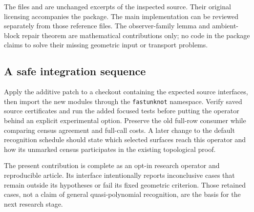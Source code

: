 The  files and
 are unchanged excerpts of
the inspected source.  Their original licensing accompanies the package.
The main implementation can be reviewed separately from those reference
files.  The observer-family lemma and ambient-block repair theorem are
mathematical contributions only; no code in the package claims to solve
their missing geometric input or transport problems.

\subsection{A safe integration sequence}

Apply the additive patch to a checkout containing the expected source
interfaces, then import the new modules through the \texttt{fastunknot}
namespace.  Verify saved source certificates and run the added focused
tests before putting the operator behind an explicit experimental option.
Preserve the old full-row consumer while comparing census agreement and
full-call costs.  A later change to the default recognition schedule
should state which selected surfaces reach this operator and how its
unmarked census participates in the existing topological proof.

The present contribution is complete as an opt-in research operator and
reproducible article.  Its interface intentionally reports inconclusive
cases that remain outside its hypotheses or fail its fixed geometric
criterion.  Those retained cases, not a claim of general quasi-polynomial
recognition, are the basis for the next research stage.
